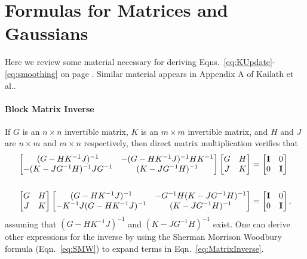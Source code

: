 \appendix

\chapter{Formulas for Matrices and Gaussians}
\label{cha:MatrixFormulas}

Here we review some material necessary for deriving
Eqns.~\eqref{eq:KUpdate}-\eqref{eq:smoothing} on page
\pageref{eq:KUpdate}.  Similar material appears in Appendix A of
Kailath et al.\cite{KSH00}.

\subsubsection{Block Matrix Inverse}
%
%

If $G$ is an $n\times n$ invertible matrix, $K$ is an $m\times m$
invertible matrix, and $H$ and $J$ are $n\times m$ and $m\times n$
respectively, then direct matrix multiplication verifies that
\begin{subequations}
  \label{eq:MatrixInverse}
  \begin{align}
    \begin{bmatrix}
      (G-HK^{-1}J)^{-1} & -(G-HK^{-1}J)^{-1}HK^{-1} \\
      -(K-JG^{-1}H)^{-1}JG^{-1} & (K-JG^{-1}H)^{-1}
    \end{bmatrix}
    \begin{bmatrix}
      G & H \\ J & K
    \end{bmatrix}
    &=
    \begin{bmatrix}
      {\bf I} & 0 \\ 0 & {\bf I}
    \end{bmatrix}\\ \nonumber \\
    \begin{bmatrix}
      G & H \\ J & K
    \end{bmatrix}
    \begin{bmatrix}
      (G-HK^{-1}J)^{-1} & -G^{-1}H(K-JG^{-1}H)^{-1} \\
      -K^{-1}J(G-HK^{-1}J)^{-1} & (K-JG^{-1}H)^{-1}
    \end{bmatrix}
    &=
    \begin{bmatrix}
      {\bf I} & 0 \\ 0 & {\bf I}
    \end{bmatrix},
  \end{align}
\end{subequations}
assuming that $(G-HK^{-1}J)^{-1}$ and $(K-JG^{-1}H)^{-1}$ exist.
One can derive other expressions for the inverse by using the Sherman
Morrison Woodbury formula (Eqn.~\eqref{eq:SMW}) to expand terms in
Eqn.~\eqref{eq:MatrixInverse}.

